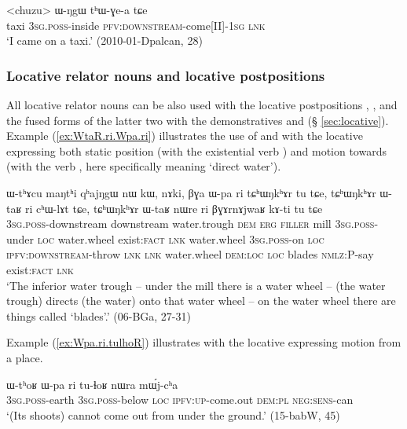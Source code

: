 \begin{exe}
\ex \label{ex:chuzu.WNgW}
\gll  <chuzu> ɯ-ŋgɯ tʰɯ-ɣe-a tɕe \\
taxi \textsc{3sg}.\textsc{poss}-inside \textsc{pfv}:\textsc{downstream}-come[II]-\textsc{1sg} \textsc{lnk} \\
\glt `I came on a taxi.' (2010-01-Dpalcan, 28)
\end{exe} 



\subsubsection{Locative relator nouns and locative postpositions} \label{sec:relator.postposition.location}
 All locative relator nouns can be also used with the locative postpositions , ,  and the fused forms of the latter two with the demonstratives  and  (§ \ref{sec:locative}). Example (\ref{ex:WtaR.ri.Wpa.ri}) illustrates the use of  and  with the locative  expressing both static position (with the existential verb ) and motion towards (with the verb , here specifically meaning `direct water').

\begin{exe}
\ex \label{ex:WtaR.ri.Wpa.ri}
\gll ɯ-tʰɤcu maŋtʰi qʰajŋgɯ nɯ kɯ, nɤki, βɣa ɯ-pa ri tɕʰɯŋkʰɤr tu tɕe, tɕʰɯŋkʰɤr ɯ-taʁ ri cʰɯ-lɤt tɕe, tɕʰɯŋkʰɤr ɯ-taʁ nɯre ri βɣɤrnɤjwaʁ kɤ-ti tu tɕe \\
\textsc{3sg}.\textsc{poss}-downstream downstream water.trough \textsc{dem} \textsc{erg} \textsc{filler} mill \textsc{3sg}.\textsc{poss}-under \textsc{loc} water.wheel exist:\textsc{fact} \textsc{lnk} water.wheel \textsc{3sg}.\textsc{poss}-on \textsc{loc} \textsc{ipfv}:\textsc{downstream}-throw \textsc{lnk} \textsc{lnk} water.wheel \textsc{dem}:\textsc{loc} \textsc{loc} blades \textsc{nmlz}:P-say exist:\textsc{fact} \textsc{lnk} \\
\glt `The inferior water trough -- under the mill there is a water wheel -- (the water trough) directs (the water) onto that water wheel -- on the water wheel there are things called `blades'.' (06-BGa, 27-31)
\end{exe}

Example (\ref{ex:Wpa.ri.tulhoR}) illustrates  with the locative  expressing motion from a place.

\begin{exe}
\ex \label{ex:Wpa.ri.tulhoR}
\gll ɯ-tʰoʁ ɯ-pa ri tu-ɬoʁ nɯra mɯ́j-cʰa \\
\textsc{3sg}.\textsc{poss}-earth \textsc{3sg}.\textsc{poss}-below \textsc{loc} \textsc{ipfv}:\textsc{up}-come.out \textsc{dem}:\textsc{pl} \textsc{neg}:\textsc{sens}-can \\
\glt `(Its shoots) cannot come out from under the ground.'  (15-babW, 45)
\end{exe}

